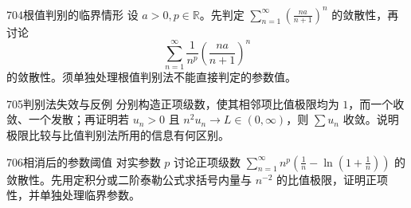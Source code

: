 \begin{exercise}{704}{根值判别的临界情形}
设 $a>0,p\in\mathbb R$。先判定 $\sum_{n=1}^{\infty}(\frac{na}{n+1})^n$ 的敛散性，再讨论
\[\sum_{n=1}^{\infty}\frac1{n^p}\left(\frac{na}{n+1}\right)^n\]
的敛散性。须单独处理根值判别法不能直接判定的参数值。
\end{exercise}
\begin{exercise}{705}{判别法失效与反例}
分别构造正项级数，使其相邻项比值极限均为 $1$，而一个收敛、一个发散；再证明若 $u_n>0$ 且 $n^2u_n\to L\in(0,\infty)$，则 $\sum u_n$ 收敛。说明极限比较与比值判别法所用的信息有何区别。
\end{exercise}
\begin{exercise}{706}{相消后的参数阈值}
对实参数 $p$ 讨论正项级数 $\sum_{n=1}^{\infty}n^p\left(\frac1n-\ln(1+\frac1n)\right)$ 的敛散性。先用定积分或二阶泰勒公式求括号内量与 $n^{-2}$ 的比值极限，证明正项性，并单独处理临界参数。
\end{exercise}
